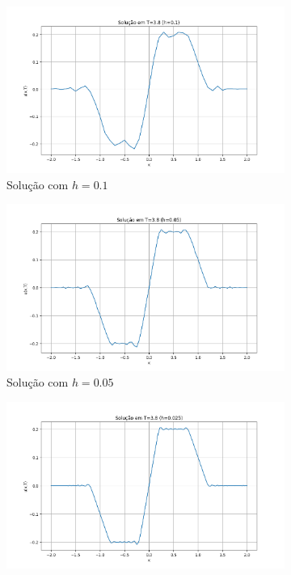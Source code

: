 \documentclass[column,amsmath,amssymb,floatfix]{revtex4}
\begin{document}
\begin{figure}[H]
	\centering
	\begin{subfigure}{0.35\textwidth}
		\includegraphics[width=\textwidth]{img/ex0201.png}
		\caption{Solução com $h=0.1$}
		\label{fig:ex2_1}
	\end{subfigure}
	\begin{subfigure}{0.35\textwidth}
		\includegraphics[width=\textwidth]{img/ex0202.png}
		\caption{Solução com $h=0.05$}
		\label{fig:ex2_2}
	\end{subfigure}
	\begin{subfigure}{0.35\textwidth}
		\includegraphics[width=\textwidth]{img/ex0203.png}

\end{subfigure}
\end{figure}
\end{document}
